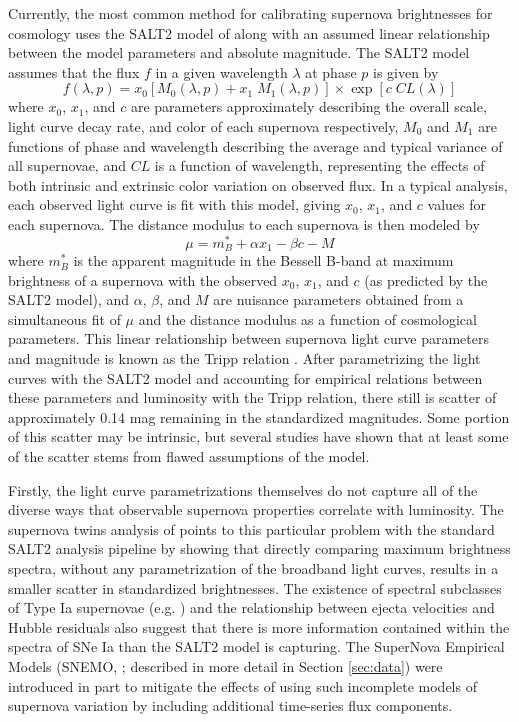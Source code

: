Currently, the most common method for calibrating supernova brightnesses for cosmology uses the SALT2 model of \cite{Guy2007} along with an assumed linear relationship between the model parameters and absolute magnitude. The SALT2 model assumes that the flux $f$ in a given wavelength $\lambda$ at phase $p$ is given by
\begin{equation}
    f(\lambda, p) = x_0 \left[M_0(\lambda, p) + x_1\;M_1(\lambda, p)\right] \times \exp\left[c\;CL(\lambda)\right]
    \label{eqn:salt_flux_model}
\end{equation}
where $x_0$, $x_1$, and $c$ are parameters approximately describing the overall scale, light curve decay rate, and color of each supernova respectively, $M_0$ and $M_1$ are functions of phase and wavelength describing the average and typical variance of all supernovae, and $CL$ is a function of wavelength, representing the effects of both intrinsic and extrinsic color variation on observed flux. In a typical analysis, each observed light curve is fit with this model, giving $x_0$, $x_1$, and $c$ values for each supernova. The distance modulus to each supernova is then modeled by
\begin{equation}
    \mu = m_B^* + \alpha x_1 -\beta c - M
\end{equation}
where $m_B^*$ is the apparent magnitude in the Bessell B-band at maximum brightness of a supernova with the observed $x_0$, $x_1$, and $c$ (as predicted by the SALT2 model), and $\alpha$, $\beta$, and $M$ are nuisance parameters obtained from a simultaneous fit of $\mu$ and the distance modulus as a function of cosmological parameters. This linear relationship between supernova light curve parameters and magnitude is known as the Tripp relation \parencite{Tripp1999}. After parametrizing the light curves with the SALT2 model and accounting for empirical relations between these parameters and luminosity with the Tripp relation, there still is scatter of approximately 0.14 mag remaining in the standardized magnitudes. Some portion of this scatter may be intrinsic, but several studies have shown that at least some of the scatter stems from flawed assumptions of the model.

Firstly, the light curve parametrizations themselves do not capture all of the diverse ways that observable supernova properties correlate with luminosity. The supernova twins analysis of \cite{Fakhouri2015} points to this particular problem with the standard SALT2 analysis pipeline by showing that directly comparing maximum brightness spectra, without any parametrization of the broadband light curves, results in a smaller scatter in standardized brightnesses. The existence of spectral subclasses of Type Ia supernovae (e.g. \cite{Branch2006}) and the relationship between ejecta velocities and Hubble residuals \parencite{Siebert2020} also suggest that there is more information contained within the spectra of SNe Ia than the SALT2 model is capturing. The SuperNova Empirical Models (SNEMO, \cite{Saunders2018}; described in more detail in Section \ref{sec:data}) were introduced in part to mitigate the effects of using such incomplete models of supernova variation by including additional time-series flux components.

